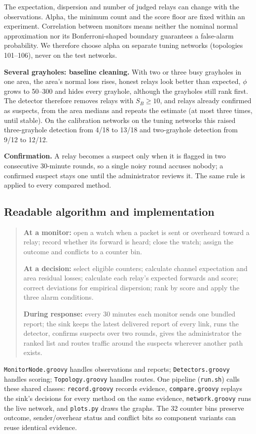 \documentclass{article}
\begin{document}
The expectation, dispersion and number of judged relays can change with the observations. Alpha, the minimum count and the score floor are fixed within an experiment. Correlation between monitors means neither the nominal normal approximation nor its Bonferroni-shaped boundary guarantees a false-alarm probability. We therefore choose alpha on separate tuning networks (topologies 101--106), never on the test networks.

\textbf{Several grayholes: baseline cleaning.} With two or three busy grayholes in one area, the area's normal loss rises, honest relays look better than expected, $\phi$ grows to 50--300 and hides every grayhole, although the grayholes still rank first. The detector therefore removes relays with $S_B\geq10$, and relays already confirmed as suspects, from the area medians and repeats the estimate (at most three times, until stable). On the calibration networks on the tuning networks this raised three-grayhole detection from 4/18 to 13/18 and two-grayhole detection from 9/12 to 12/12.

\textbf{Confirmation.} A relay becomes a suspect only when it is flagged in two consecutive 30-minute rounds, so a single noisy round accuses nobody; a confirmed suspect stays one until the administrator reviews it. The same rule is applied to every compared method.

\subsection{Readable algorithm and implementation}
\begin{quote}\small
\textbf{At a monitor:} open a watch when a packet is sent or overheard toward a relay; record whether its forward is heard; close the watch; assign the outcome and conflicts to a counter bin.\par
\textbf{At a decision:} select eligible counters; calculate channel expectation and area residual losses; calculate each relay's expected forwards and score; correct deviations for empirical dispersion; rank by score and apply the three alarm conditions.\par
\textbf{During response:} every 30 minutes each monitor sends one bundled report; the sink keeps the latest delivered report of every link, runs the detector, confirms suspects over two rounds, gives the administrator the ranked list and routes traffic around the suspects wherever another path exists.
\end{quote}
\texttt{MonitorNode.groovy} handles observations and reports; \texttt{Detectors.groovy} handles scoring; \texttt{Topology.groovy} handles routes. One pipeline (\texttt{run.sh}) calls these shared classes: \texttt{record.groovy} records evidence, \texttt{compare.groovy} replays the sink's decisions for every method on the same evidence, \texttt{network.groovy} runs the live network, and \texttt{plots.py} draws the graphs. The 32 counter bins preserve outcome, sender/overhear status and conflict bits so component variants can reuse identical evidence.
\end{document}
